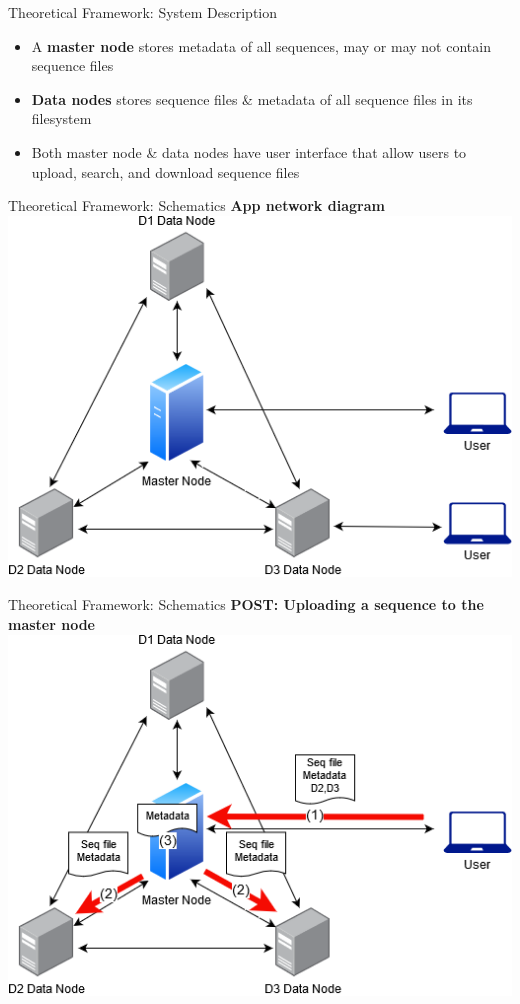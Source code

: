 \documentclass{beamer}
\begin{document}
\begin{frame}{Theoretical Framework: System Description}
    \begin{itemize}
        \item A \textbf{master node} stores metadata of all sequences, may or may not contain sequence files
        \item \textbf{Data nodes} stores sequence files & metadata of all sequence files in its filesystem
        \item Both master node & data nodes have user interface that allow users to upload, search, and download sequence files
    \end{itemize}
\end{frame}
\begin{frame}{Theoretical Framework: Schematics}
\textbf{App network diagram} \\ \medskip
\centering
\includegraphics[scale=0.5]{thesis1.png}
\end{frame}

\begin{frame}{Theoretical Framework: Schematics}
\textbf{POST: Uploading a sequence to the master node} \\ \medskip
\centering
\includegraphics[scale=0.5]{thesis3.png}
\end{frame}
\end{document}
